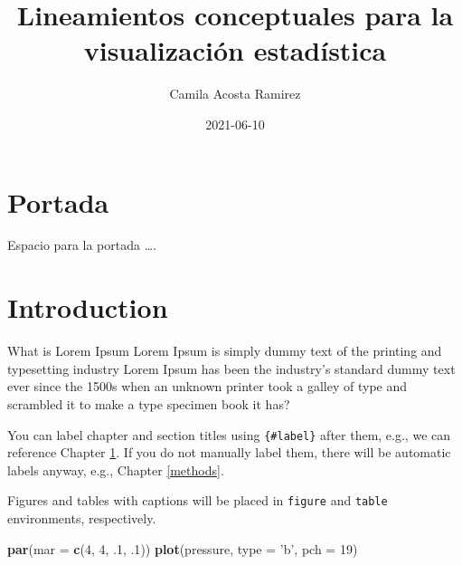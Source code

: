 \documentclass[
]{book}
\title{Lineamientos conceptuales para la visualización estadística}
\author{Camila Acosta Ramirez}
\date{2021-06-10}
\newenvironment{Shaded}{\begin{snugshade}}{\end{snugshade}}
\newcommand{\DataTypeTok}[1]{\textcolor[rgb]{0.13,0.29,0.53}{#1}}
\newcommand{\DecValTok}[1]{\textcolor[rgb]{0.00,0.00,0.81}{#1}}
\newcommand{\FloatTok}[1]{\textcolor[rgb]{0.00,0.00,0.81}{#1}}
\newcommand{\KeywordTok}[1]{\textcolor[rgb]{0.13,0.29,0.53}{\textbf{#1}}}
\newcommand{\NormalTok}[1]{#1}
\newcommand{\StringTok}[1]{\textcolor[rgb]{0.31,0.60,0.02}{#1}}
\begin{document}
\maketitle

{
\setcounter{tocdepth}{1}
\tableofcontents
}
\hypertarget{portada}{%
\chapter*{Portada}\label{portada}}

Espacio para la portada \ldots.

\hypertarget{intro}{%
\chapter{Introduction}\label{intro}}

What is Lorem Ipsum Lorem Ipsum is simply dummy text of the printing and typesetting industry Lorem Ipsum has been the industry's standard dummy text ever since the 1500s when an unknown printer took a galley of type and scrambled it to make a type specimen book it has?

You can label chapter and section titles using \texttt{\{\#label\}} after them, e.g., we can reference Chapter \ref{intro}. If you do not manually label them, there will be automatic labels anyway, e.g., Chapter \ref{methods}.

Figures and tables with captions will be placed in \texttt{figure} and \texttt{table} environments, respectively.

\begin{Shaded}
\begin{Highlighting}[]
\KeywordTok{par}\NormalTok{(}\DataTypeTok{mar =} \KeywordTok{c}\NormalTok{(}\DecValTok{4}\NormalTok{, }\DecValTok{4}\NormalTok{, }\FloatTok{.1}\NormalTok{, }\FloatTok{.1}\NormalTok{))}
\KeywordTok{plot}\NormalTok{(pressure, }\DataTypeTok{type =} \StringTok{'b'}\NormalTok{, }\DataTypeTok{pch =} \DecValTok{19}\NormalTok{)}
\end{Highlighting}
\end{Shaded}
\end{document}
